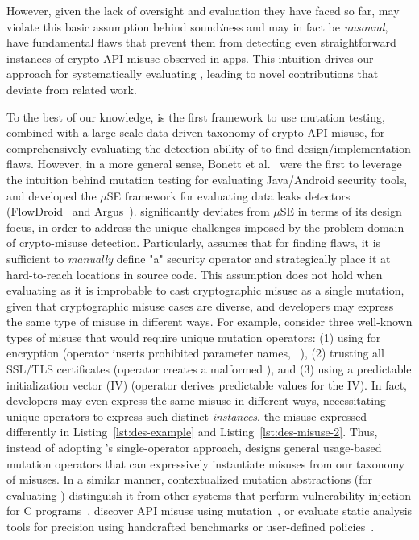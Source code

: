 However, given the lack of oversight and evaluation they have faced so far, {\em \detectors} may violate this basic assumption behind sound{\em i}ness and may in fact be {\em unsound}, \ie have fundamental flaws that prevent them from detecting even straightforward instances of crypto-API misuse observed in apps.
This intuition drives our approach for systematically evaluating \detectors, leading to novel contributions that deviate from related work.

To the best of our knowledge, \tool is the first framework to use mutation testing, combined with a large-scale data-driven taxonomy of crypto-API misuse, for comprehensively evaluating the detection ability of \detectors to find design/implementation flaws.
However, in a more general sense, Bonett et al.~\cite{bkm+18} were the first to leverage the intuition behind mutation testing for evaluating Java/Android security tools, and developed the $\mu$SE framework for evaluating data leaks detectors (\eg FlowDroid~\cite{arf+14} and Argus~\cite{wror14}).
\tool significantly deviates from $\mu$SE in terms of its design focus, in order to address the unique challenges imposed by the problem domain of crypto-misuse detection. Particularly, \muse assumes that for finding flaws, it is sufficient to {\em manually} define "a" security operator and strategically place it at hard-to-reach locations in source code.
This assumption does not hold when evaluating \detectors as it is improbable to cast cryptographic misuse as a single mutation, given that cryptographic misuse cases are diverse, and developers may express the same type of misuse in different ways.
For example, consider three well-known types of misuse that would require unique mutation operators: {\sf (1)} using \DES for encryption (operator inserts prohibited parameter names, \eg\ \DES), {\sf (2)} trusting all SSL/TLS certificates (operator creates a malformed \trustManager), and {\sf (3)} using a predictable initialization vector (IV) (operator derives predictable values for the IV).
In fact, developers may even express the same misuse in different ways, necessitating unique operators to express such distinct {\em instances}, \eg the \DES misuse expressed differently in Listing~\ref{lst:des-example} and Listing~\ref{lst:des-misuse-2}.
Thus, instead of adopting \muse's single-operator approach, \tool designs general usage-based mutation operators that can expressively instantiate misuses from our taxonomy of misuses.
In a similar manner, \tools contextualized mutation abstractions (\ie for evaluating \detectors) distinguish it from other systems that perform vulnerability injection for C programs~\cite{dhk+16}, discover API misuse using mutation~\cite{WLW+19,GKL+19}, or evaluate static analysis tools for precision using handcrafted benchmarks or user-defined policies~\cite{QWR18,PBW18}.


